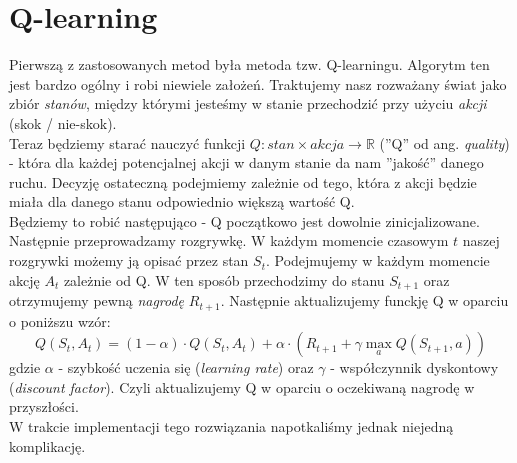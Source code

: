 \documentclass[12pt, A4]{article}
\begin{document}
\section{Q-learning}
Pierwszą z zastosowanych metod była metoda tzw. Q-learningu. Algorytm ten jest bardzo ogólny i robi niewiele założeń. Traktujemy nasz rozważany świat jako zbiór \textit{stanów}, między którymi jesteśmy w stanie przechodzić przy użyciu \textit{akcji} (skok / nie-skok).  \\
	Teraz będziemy starać nauczyć funkcji $Q: stan \times akcja \rightarrow \mathbb{R}$ (''Q'' od ang. \textit{quality}) - która dla każdej potencjalnej akcji w danym stanie da nam ''jakość'' danego ruchu. Decyzję ostateczną podejmiemy zależnie od tego, która z akcji będzie miała dla danego stanu odpowiednio większą wartość Q. \\	
	Będziemy to robić następująco - Q początkowo jest dowolnie zinicjalizowane. Następnie przeprowadzamy rozgrywkę. W każdym momencie czasowym $t$ naszej rozgrywki możemy ją opisać przez stan $S_t$. Podejmujemy w każdym momencie akcję $A_t$ zależnie od Q. W ten sposób przechodzimy do stanu $S_{t+1}$ oraz otrzymujemy pewną \textit{nagrodę} $R_{t+1}$. Następnie aktualizujemy funckję Q w oparciu o poniższu wzór:
	\[	Q(S_t, A_t) = (1-\alpha)\cdot Q(S_t, A_t) + \alpha \cdot \left( R_{t+1} + \gamma \max_a Q(S_{t+1}, a) \right)	\]
	gdzie $\alpha$ - szybkość uczenia się (\textit{learning rate}) oraz $\gamma$ - współczynnik dyskontowy (\textit{discount factor}).
	Czyli aktualizujemy Q w oparciu o oczekiwaną nagrodę w przyszłości. \\
	W trakcie implementacji tego rozwiązania napotkaliśmy jednak niejedną komplikację. \\
\end{document}
